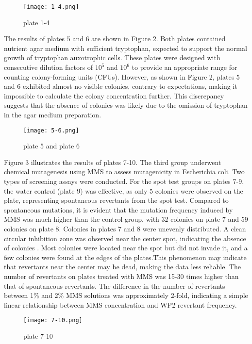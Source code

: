 \documentclass[a4paper,10pt]{article}
\begin{document}
\begin{multicols}{2}
\begin{figure}[H]
\centering
\texttt{[image: 1-4.png]}
\caption{plate 1-4} \label{fig1}
\end{figure}


The results of plates 5 and 6 are shown in Figure 2. Both plates contained nutrient agar medium with sufficient tryptophan, expected to support the normal growth of tryptophan auxotrophic cells. These plates were designed with consecutive dilution factors of $10^5$ and $10^6$ to provide an appropriate range for counting colony-forming units (CFUs). However, as shown in Figure 2, plates 5 and 6 exhibited almost no visible colonies, contrary to expectations, making it impossible to calculate the colony concentration further. This discrepancy suggests that the absence of colonies was likely due to the omission of tryptophan in the agar medium preparation.


\begin{figure}[H]
\centering
\texttt{[image: 5-6.png]}
\caption{plate 5 and plate 6} \label{fig2}
\end{figure}


Figure 3 illustrates the results of plates 7-10. The third group underwent chemical mutagenesis using MMS to assess mutagenicity in Escherichia coli. Two types of screening assays were conducted. For the spot test groups on plates 7-9, the water control (plate 9) was effective, as only 5 colonies were observed on the plate, representing spontaneous revertants from the spot test. Compared to spontaneous mutations, it is evident that the mutation frequency induced by MMS was much higher than the control group, with 32 colonies on plate 7 and 59 colonies on plate 8. Colonies in plates 7 and 8 were unevenly distributed. A clean circular inhibition zone was observed near the center spot, indicating the absence of colonies \cite{krishna2007uv}. Most colonies were located near the spot but did not invade it, and a few colonies were found at the edges of the plates.This phenomenon may indicate that revertants near the center may be dead, making the data less reliable. The number of revertants on plates treated with MMS was 15-30 times higher than that of spontaneous revertants. The difference in the number of revertants between 1\% and 2\% MMS solutions was approximately 2-fold, indicating a simple linear relationship between MMS concentration and WP2 revertant frequency.


\begin{figure}[H]
\centering
\texttt{[image: 7-10.png]}
\caption{plate 7-10} \label{fig3}
\end{figure}



\end{multicols}
\end{document}
